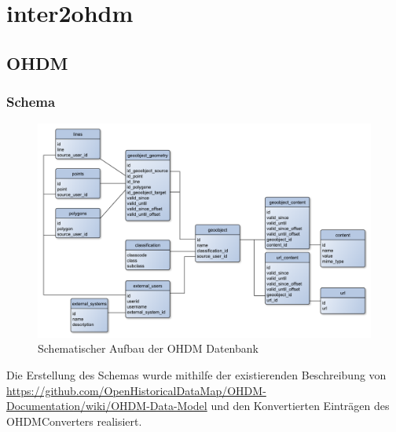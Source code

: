 \part{inter2ohdm}
\chapter{OHDM}
\section{Schema}
\begin{figure}[h]
	\caption{Schematischer Aufbau der OHDM Datenbank}
	\includegraphics[width=\linewidth]{img/ohdm_datamodel.pdf}
\end{figure}
Die Erstellung des Schemas wurde mithilfe der existierenden Beschreibung von \\
\url{https://github.com/OpenHistoricalDataMap/OHDM-Documentation/wiki/OHDM-Data-Model} und den Konvertierten Einträgen des  OHDMConverters realisiert.

